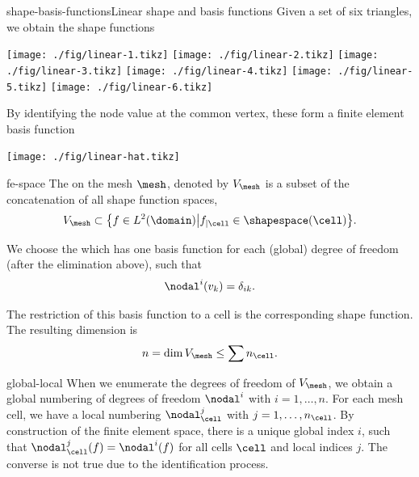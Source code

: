 \begin{Example*}{shape-basis-functions}{Linear shape and basis functions}
  Given a set of six triangles, we obtain the shape functions
  \begin{center}
    \texttt{[image: ./fig/linear-1.tikz]}
    \texttt{[image: ./fig/linear-2.tikz]}
    \texttt{[image: ./fig/linear-3.tikz]}
    \texttt{[image: ./fig/linear-4.tikz]}
    \texttt{[image: ./fig/linear-5.tikz]}
    \texttt{[image: ./fig/linear-6.tikz]}
  \end{center}
  By identifying the node value at the common vertex, these form a finite element basis function
  \begin{center}
    \texttt{[image: ./fig/linear-hat.tikz]}    
  \end{center}
\end{Example*}

\begin{Definition}{fe-space}
  The  on the mesh $\mesh$, denoted by
  $V_\mesh$ is a subset of the concatenation of all shape function
  spaces,
  \begin{gather}
    V_\mesh \subset \bigl\{ f\in L^2(\domain) \big|
    f_{|\cell} \in \shapespace(\cell) \bigr\}.
  \end{gather}
  
  We choose the  which has one basis function for
  each (global) degree of freedom (after the elimination above), such
  that
  \begin{gather}
    \nodal^i(v_k) = \delta_{ik}.
  \end{gather}

  The restriction of this basis function to a cell is the
  corresponding shape function.  The resulting dimension is
  \begin{gather}
    n = \dim V_\mesh \le \sum n_\cell.
  \end{gather}
\end{Definition}

\begin{Notation}{global-local}
  When we enumerate the degrees of freedom of $V_\mesh$, we obtain a
  global numbering of degrees of freedom $\nodal^i$ with
  $i=1,\dots,n$. For each mesh cell, we have a local numbering
  $\nodal_\cell^j$ with $j=1,\dots,n_{\cell}$. By construction of the finite
  element space, there is a unique global index $i$, such that
  $\nodal_\cell^j(f) = \nodal^i(f)$ for all cells $\cell$ and local
  indices $j$. The converse is not true due to the identification
  process.
\end{Notation}

